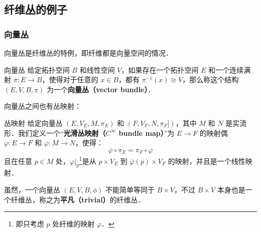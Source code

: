 \subsection{纤维丛的例子}

\subsubsection{向量丛}
向量丛是纤维丛的特例，即纤维都是向量空间的情况．

\begin{definition}{向量丛}
给定拓扑空间 $B$ 和线性空间 $V$，如果存在一个拓扑空间 $E$ 和一个连续满射 $\pi:E\rightarrow B$，使得对于任意的 $x\in B$，都有 $\pi^{-1}(x)\cong V$，那么称这个结构 $(E, V, B, \pi)$ 为一个\textbf{向量丛（vector bundle）}．
\end{definition}

向量丛之间也有丛映射：

\begin{definition}{丛映射}
给定向量丛 $(E, V_E, M, \pi_E)$ 和 $(F, V_F, N, \pi_F])$，其中 $M$ 和 $N$ 是实流形．我们定义一个“\textbf{光滑丛映射（$C^\infty$ bundle map）}”为 $E\rightarrow F$ 的映射偶 $\varphi: E\rightarrow F$ 和 $\overline{\varphi}: M\rightarrow N$，使得：
\begin{equation}
\overline{\varphi}\circ\pi_E=\pi_F\circ\varphi
\end{equation}
且在任意 $p\in M$ 处，$\varphi|_p$\footnote{即只考虑 $p$ 处纤维的映射 $\varphi$．}是从 $p\times V_E$ 到 $\overline{\varphi}(p)\times V_F$ 的映射，并且是一个线性映射．
\end{definition}

虽然，一个向量丛 $(E, V, B, \phi)$ 不能简单等同于 $B\times V$，不过 $B\times V$ 本身也是一个纤维丛，称之为\textbf{平凡（trivial）}的纤维丛．




